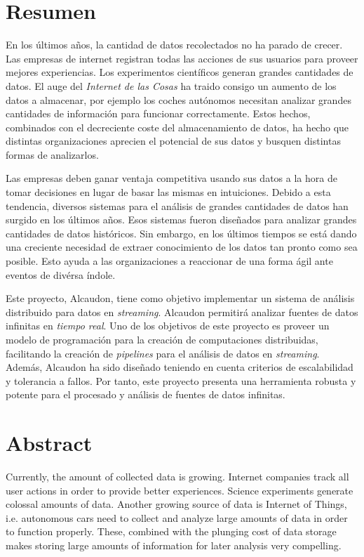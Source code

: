 \chapter{Resumen}

En los últimos años, la cantidad de datos recolectados no ha parado de crecer.
Las empresas de internet registran todas las acciones de sus usuarios para
proveer mejores experiencias. Los experimentos científicos generan grandes
cantidades de datos. El auge del \textit{Internet de las Cosas} ha traido
consigo un aumento de los datos a almacenar, por ejemplo los coches autónomos
necesitan analizar grandes cantidades de información para funcionar
correctamente. Estos hechos, combinados con el decreciente coste del
almacenamiento de datos, ha hecho que distintas organizaciones aprecien el
potencial de sus datos y busquen distintas formas de analizarlos.

Las empresas deben ganar ventaja competitiva usando sus datos a la hora de tomar
decisiones en lugar de basar las mismas en intuiciones. Debido a esta tendencia,
diversos sistemas para el análisis de grandes cantidades de datos han surgido en
los últimos años. Esos sistemas fueron diseñados para analizar grandes
cantidades de datos históricos. Sin embargo, en los últimos tiempos se está
dando una creciente necesidad de extraer conocimiento de los datos tan pronto
como sea posible. Esto ayuda a las organizaciones a reaccionar de una forma ágil
ante eventos de divérsa índole.

Este proyecto, Alcaudon, tiene como objetivo implementar un sistema de análisis
distribuido para datos en \textit{streaming}. Alcaudon permitirá analizar
fuentes de datos infinitas en \textit{tiempo real}. Uno de los objetivos de este
proyecto es proveer un modelo de programación para la creación de computaciones
distribuidas, facilitando la creación de \textit{pipelines} para el análisis de
datos en \textit{streaming}. Además, Alcaudon ha sido diseñado teniendo en
cuenta criterios de escalabilidad y tolerancia a fallos. Por tanto, este
proyecto presenta una herramienta robusta y potente para el procesado y análisis
de fuentes de datos infinitas.

\chapter{Abstract}

Currently, the amount of collected data is growing. Internet companies track all
user actions in order to provide better experiences. Science experiments
generate colossal amounts of data. Another growing source of data is Internet
of Things, i.e. autonomous cars need to collect and analyze large amounts of
data in order to function properly. These, combined with the plunging cost of
data storage makes storing large amounts of information for later analysis very
compelling.


